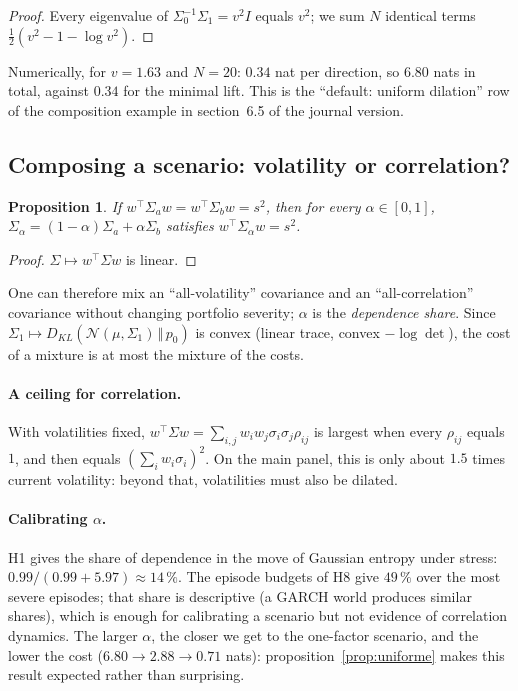 \documentclass[11pt]{article}
\theoremstyle{plain}
\newtheorem{proposition}{Proposition}[section]
\theoremstyle{definition}
\theoremstyle{remark}
\newcommand{\N}{\mathcal{N}}
\newcommand{\KL}[2]{D_{KL}\!\left(#1\,\Vert\,#2\right)}
\begin{document}
\begin{proof}
Every eigenvalue of $\Sigma_0^{-1}\Sigma_1=v^2I$ equals $v^2$; we sum $N$
identical terms $\tfrac12(v^2-1-\log v^2)$.
\end{proof}

\noindent Numerically, for $v=1.63$ and $N=20$: $0.34$ nat per direction, so
$6.80$ nats in total, against $0.34$ for the minimal lift. This is the
``default: uniform dilation'' row of the composition example in section~6.5 of the journal version.

\subsection{Composing a scenario: volatility or correlation?}

\begin{proposition}
If $w^\top\Sigma_aw=w^\top\Sigma_bw=s^2$, then for every $\alpha\in[0,1]$,
$\Sigma_\alpha=(1-\alpha)\Sigma_a+\alpha\Sigma_b$ satisfies
$w^\top\Sigma_\alpha w=s^2$.
\end{proposition}

\begin{proof}
$\Sigma\mapsto w^\top\Sigma w$ is linear.
\end{proof}

One can therefore mix an ``all-volatility'' covariance and an
``all-correlation'' covariance without changing portfolio severity; $\alpha$
is the \emph{dependence share}. Since $\Sigma_1\mapsto\KL{\N(\mu,\Sigma_1)}{p_0}$
is convex (linear trace, convex $-\log\det$), the cost of a mixture is at most
the mixture of the costs.

\paragraph{A ceiling for correlation.} With volatilities fixed,
$w^\top\Sigma w=\sum_{i,j}w_iw_j\sigma_i\sigma_j\rho_{ij}$ is largest when
every $\rho_{ij}$ equals $1$, and then equals $(\sum_iw_i\sigma_i)^2$. On the
main panel, this is only about $1.5$ times current volatility: beyond that,
volatilities must also be dilated.

\paragraph{Calibrating $\alpha$.} H1 gives the share of dependence in the move
of Gaussian entropy under stress: $0.99/(0.99+5.97)\approx14\,\%$. The
episode budgets of H8 give $49\,\%$ over the most severe episodes; that share
is descriptive (a GARCH world produces similar shares), which is enough for
calibrating a scenario but not evidence of correlation dynamics. The larger $\alpha$, the closer
we get to the one-factor scenario, and the lower the cost
($6.80\to2.88\to0.71$ nats): proposition~\ref{prop:uniforme} makes this result
expected rather than surprising.
\end{document}
